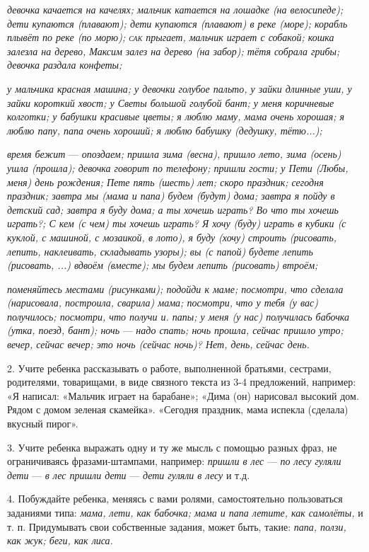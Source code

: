 \documentclass[a5paper]{book}
\renewcommand{\emph}[1]{\textit{#1}}
\begin{document}
\emph{девочка качается на качелях; мальчик катается на лошадке (на
велосипеде); дети купаются (плавают); дети купаются (плавают) в реке
(море); корабль плывёт по реке (по морю); \textsc{сак} прыгает, мальчик
играет с собакой; кошка залезла на дерево, Максим залез на дерево (на
забор); тётя собрала грибы; девочка раздала конфеты;}

\emph{у мальчика красная машина; у девочки голубое пальто, у зайки
длинные уши, у зайки короткий хвост; у Светы большой голубой бант; у
меня коричневые колготки; у бабушки красивые цветы; я люблю маму, мама
очень хорошая; я люблю папу, папа очень хороший; я люблю бабушку
(дедушку, тётю...);}

\emph{время бежит} --- \emph{опоздаем; пришла зима (весна), пришло лето,
зима (осень) ушла (прошла); девочка говорит по телефону; пришли гости; у
Пети (Любы, меня) день рождения; Пете пять (шесть) лет; скоро праздник;
сегодня праздник; завтра мы (мама и папа) будем (будут) дома; завтра я
пойду в детский сад; завтра я буду дома; а ты хочешь играть? Во что ты
хочешь играть?; С кем (с чем) ты хочешь играть? Я хочу (буду) играть в
кубики (с куклой, с машиной, с мозаикой, в лото), я буду (хочу) строить
(рисовать, лепить, наклеивать, складывать узоры); вы (с папой) будете
лепить (рисовать, ...) вдвоём (вместе); мы будем лепить (рисовать)
втроём;}

\emph{поменяйтесь местами (рисунками); подойди к маме; посмотри, что
сделала (нарисовала, построила, сварила) мама; посмотри,} \emph{что у
тебя (у вас) получилось; посмотри, что получи и. папы; у меня (у нас)
получилась бабочка (утка, поезд, бант); ночь} --- \emph{надо спать; ночь
прошла, сейчас пришло утро; вечер, сейчас вечер; это ночь (сейчас ночь)?
Нет, день, сейчас день.}

2. Учите ребенка рассказывать о работе, выполненной братьями, сестрами,
родителями, товарищами, в виде связного текста из 3-4 предложений,
например: «Я написал: «Мальчик играет на барабане»; «Дима (он) нарисовал
высокий дом. Рядом с домом зеленая скамейка». «Сегодня праздник, мама
испекла (сделала) вкусный пирог».

3. Учите ребенка выражать одну и ту же мысль с помощью разных фраз, не
ограничиваясь фразами-штампами, например: \emph{пришли в лес} ---
\emph{по лесу гуляли дети} --- \emph{в лес пришли дети} --- \emph{дети
гуляли в лесу} и т.д.

4. Побуждайте ребенка, меняясь с вами ролями, самостоятельно
пользоваться заданиями типа: \emph{мама, лети, как бабочка; мама и папа
летите, как самолёты,} и т. п. Придумывать свои собственные задания,
может быть, такие: \emph{папа, ползи, как жук; беги, как лиса.}
\end{document}
